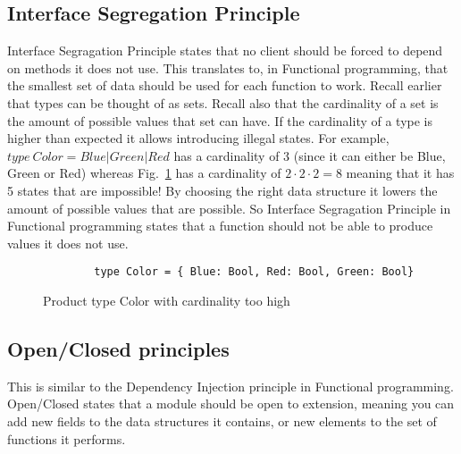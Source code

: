 \subsection{Interface Segregation Principle} 

Interface Segragation Principle states that no client should be forced to depend
on methods it does not use. This translates to, in Functional
programming, that the smallest set of data should be used for each function to
work. Recall earlier that types can be thought of as sets. Recall also that the
cardinality of a set is the amount of possible values that set can have. If the
cardinality of a type is higher than expected it allows introducing illegal
states. For example, $type\ Color = Blue | Green | Red$ has a cardinality of 3
(since it can either be Blue, Green or Red) whereas Fig.~\ref{colorcardinality}
has a cardinality of $2\cdot 2\cdot 2 = 8$ meaning that it has 5 states that are
impossible! By choosing the right data structure it lowers the amount of
possible values that are possible. So Interface Segragation Principle in
Functional programming states that a function should not be able to produce
values it does not use.

\begin{figure}[H]
    \begin{lstlisting}
        type Color = { Blue: Bool, Red: Bool, Green: Bool}
    \end{lstlisting}
    \caption{Product type Color with cardinality too high}
    \label{colorcardinality}
\end{figure}

\subsection{Open/Closed principles}

This is similar to the Dependency Injection principle in Functional programming.
Open/Closed states that a module should be open to extension, meaning you can
add new fields to the data structures it contains, or new elements to the set of
functions it performs. 








